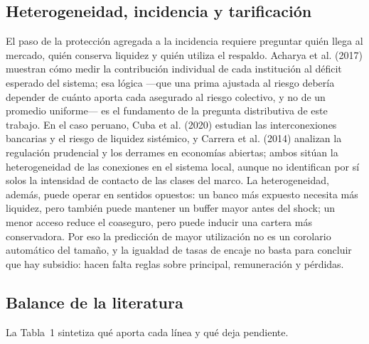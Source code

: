 \documentclass[11pt,a4paper]{article}
\begin{document}
\subsection{Heterogeneidad, incidencia y tarificación}
El paso de la protección agregada a la incidencia requiere preguntar quién llega al mercado, quién conserva liquidez y quién utiliza el respaldo. Acharya et al. (2017) muestran cómo medir la contribución individual de cada institución al déficit esperado del sistema; esa lógica ---que una prima ajustada al riesgo debería depender de cuánto aporta cada asegurado al riesgo colectivo, y no de un promedio uniforme--- es el fundamento de la pregunta distributiva de este trabajo. En el caso peruano, Cuba et al. (2020) estudian las interconexiones bancarias y el riesgo de liquidez sistémico, y Carrera et al. (2014) analizan la regulación prudencial y los derrames en economías abiertas; ambos sitúan la heterogeneidad de las conexiones en el sistema local, aunque no identifican por sí solos la intensidad de contacto de las clases del marco. La heterogeneidad, además, puede operar en sentidos opuestos: un banco más expuesto necesita más liquidez, pero también puede mantener un buffer mayor antes del shock; un menor acceso reduce el coaseguro, pero puede inducir una cartera más conservadora. Por eso la predicción de mayor utilización no es un corolario automático del tamaño, y la igualdad de tasas de encaje no basta para concluir que hay subsidio: hacen falta reglas sobre principal, remuneración y pérdidas.

\subsection{Balance de la literatura}
La Tabla~1\label{tab:balance} sintetiza qué aporta cada línea y qué deja pendiente.
\end{document}
